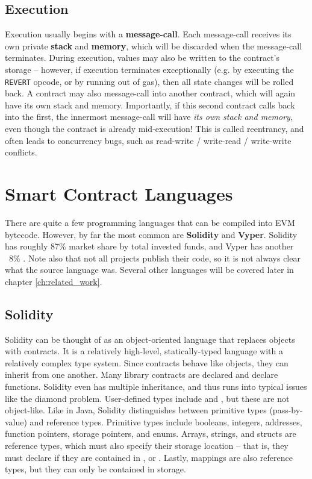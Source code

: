 \subsection{Execution}
Execution usually begins with a \textbf{message-call}. Each message-call receives its own private \textbf{stack} and \textbf{memory}, which will be discarded when the message-call terminates. During execution, values may also be written to the contract's storage -- however, if execution terminates exceptionally (e.g. by executing the \lstinline{REVERT} opcode, or by running out of gas), then all state changes will be rolled back. A contract may also message-call into another contract, which will again have its own stack and memory. Importantly, if this second contract calls back into the first, the innermost message-call will have \textit{its own stack and memory}, even though the contract is already mid-execution! This is called reentrancy, and often leads to concurrency bugs, such as read-write / write-read / write-write conflicts.

\section{Smart Contract Languages}
There are quite a few programming languages that can be compiled into EVM bytecode. However, by far the most common are \textbf{Solidity} and \textbf{Vyper}. Solidity has roughly 87\% market share by total invested funds, and Vyper has another ~8\% \cite{solidity-vs-vyper}. Note also that not all projects publish their code, so it is not always clear what the source language was. Several other languages will be covered later in chapter \ref{ch:related_work}.

\subsection{Solidity}
Solidity can be thought of as an object-oriented language that replaces objects with contracts. It is a relatively high-level, statically-typed language with a relatively complex type system. Since contracts behave like objects, they can inherit from one another. Many library contracts are declared  and declare  functions. Solidity even has multiple inheritance, and thus runs into typical issues like the diamond problem. User-defined types include  and , but these are not object-like. Like in Java, Solidity distinguishes between primitive types (pass-by-value) and reference types. Primitive types include booleans, integers, addresses, function pointers, storage pointers, and enums. Arrays, strings, and structs are reference types, which must also specify their storage location -- that is, they must declare if they are contained in ,  or . Lastly, mappings are also reference types, but they can only be contained in storage.
